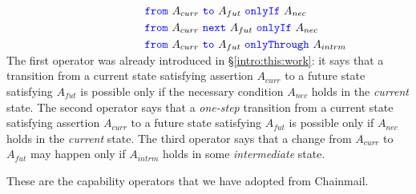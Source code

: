 \\
$ \strut \hspace{1.7in} {\color{blue}\texttt{from}}\ A_{curr}\ {\color{blue}\texttt{to}}\ A_{fut}\ {\color{blue}\texttt{onlyIf}}\ A_{nec} $ \\
$ \strut \hspace{1.7in}   {\color{blue}\texttt{from}}\ A_{curr}\ {\color{blue}\texttt{next}}\ A_{fut}\ {\color{blue}\texttt{onlyIf}}\ A_{nec} $ \\
$ \strut \hspace{1.7in}   {\color{blue}\texttt{from}}\ A_{curr}\ {\color{blue}\texttt{to}}\ A_{fut}\ {\color{blue}\texttt{onlyThrough}}\ A_{intrm} $
\\
The first operator was already introduced in \S \ref{intro:this:work}: it says that  
a  {transition} from a current state satisfying assertion $A_{curr}$ to a future
state satisfying $A_{fut}$  is possible only if  the   necessary 
condition
$A_{nec}$ holds in the \emph{current} state.
%
{The  second operator says    that 
a  \emph{one-step} {transition} from a current state satisfying assertion $A_{curr}$ to a future
state satisfying $A_{fut}$  
is possible only if %
$A_{nec}$ holds in the \emph{current} state.   
The   third operator   says that a change from %
 $A_{curr}$ to  $A_{fut}$  may happen only if %
 $A_{intrm}$ holds in some \emph{intermediate} state.}
 
  
%  

 These are the capability operators that we have 
adopted from Chainmail.


